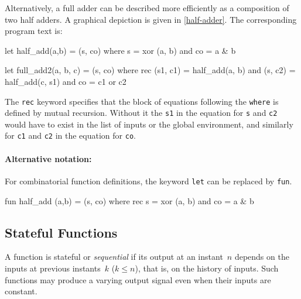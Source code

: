 \documentclass[11pt,titlepage,twoside]{report}
\newcommand{\zls}[1]{\texttt{#1}}
\begin{document}
Alternatively, a full adder can be described more efficiently as a composition
of two half adders. A graphical depiction is given in
\cref{half-adder}. The corresponding program text is:
\begin{chklisting}
let half_add(a,b) = (s, co) where
       s = xor (a, b)
   and co = a & b
\end{chklisting}
%
\begin{chklisting}
let full_add2(a, b, c) = (s, co) where
  rec (s1, c1) = half_add(a, b)
  and (s, c2) = half_add(c, s1)
  and co = c1 or c2
\end{chklisting}

The \zls{rec} keyword specifies that the block of equations following the 
\zls{where} is defined by mutual recursion.
Without it the \zls{s1} in the equation for \zls{s} and \zls{c2} would have 
to exist in the list of inputs or the global environment, and similarly for 
\zls{c1} and \zls{c2} in the equation for \zls{co}.

\paragraph{Alternative notation:} For combinatorial function definitions, 
the keyword \zls{let} can be replaced by \zls{fun}.
\begin{chklisting}[include=xor]
fun half_add (a,b) = (s, co) where
  rec s = xor (a, b)
  and co = a & b
\end{chklisting}

\subsection{Stateful Functions\label{nodefunc}} %

A function is stateful or \emph{sequential} if its output at an instant~$n$ 
depends on the inputs at previous instants~$k$ ($k \leq n$), that is, on the 
history of inputs.
Such functions may produce a varying output signal even when their inputs 
are constant.
\end{document}
